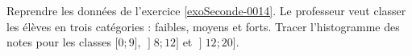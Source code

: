 
\begin{exercice}\label{exosmath-0535}

    Reprendre les données de l'exercice \ref{exoSeconde-0014}. Le professeur veut classer les élèves en trois catégories : faibles, moyens et forts. Tracer l'histogramme des notes pour les classes \( \mathopen[ 0 ;9 \mathclose]\), \( \mathopen] 8 ; 12 \mathclose]\) et \( \mathopen] 12;20 \mathclose]\).

\end{exercice}
